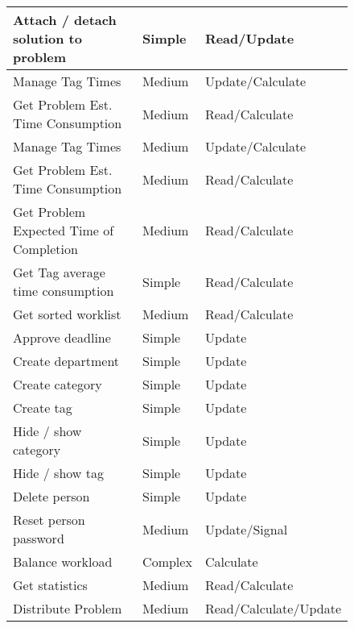 \begin{figure}[hpt]
\begin{center}
\begin{tabular}{|l|l|l|}
Attach / detach solution to problem	&   Simple & Read/Update   \\ \hline%
Manage Tag Times &   Medium & Update/Calculate \\ \hline
Get Problem Est. Time Consumption 		&   Medium & Read/Calculate   \\ \hline%
Manage Tag Times &   Medium & Update/Calculate \\ \hline
Get Problem Est. Time Consumption 					&   Medium & Read/Calculate   \\ \hline%
Get Problem Expected Time of Completion 					&   Medium & Read/Calculate   \\ \hline%
Get Tag average time consumption					&   Simple & Read/Calculate   \\ \hline%
Get sorted worklist 								&   Medium & Read/Calculate   \\ \hline%
Approve deadline 						&   Simple & Update   \\ \hline%
Create department 					&   Simple & Update   \\ \hline%
Create category 						&   Simple & Update   \\ \hline%
Create tag									&   Simple & Update   \\ \hline%
Hide / show category				&   Simple & Update   \\ \hline%
Hide / show tag							&   Simple & Update   \\ \hline%
Delete person 							&   Simple & Update   \\ \hline%
Reset person password 			&   Medium & Update/Signal   \\ \hline%
Balance workload 						&   Complex & Calculate   \\ \hline%
Get statistics							&   Medium & Read/Calculate   \\ \hline%
Distribute Problem & Medium & Read/Calculate/Update \\ \hline%
\end{tabular}
\end{center}
\label{tab:functionlist}
\end{figure}

